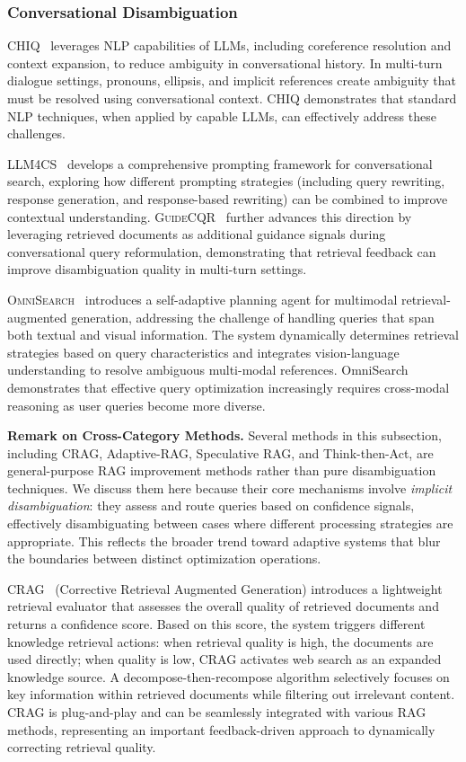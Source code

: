 \documentclass{article}
\begin{document}
\subsubsection{Conversational Disambiguation}

\textsc{CHIQ}~\citep{CHIQ} leverages NLP capabilities of LLMs, including coreference resolution and context expansion, to reduce ambiguity in conversational history. In multi-turn dialogue settings, pronouns, ellipsis, and implicit references create ambiguity that must be resolved using conversational context. CHIQ demonstrates that standard NLP techniques, when applied by capable LLMs, can effectively address these challenges.

\textsc{LLM4CS}~\citep{LLM4CS} develops a comprehensive prompting framework for conversational search, exploring how different prompting strategies (including query rewriting, response generation, and response-based rewriting) can be combined to improve contextual understanding. \textsc{GuideCQR}~\citep{GuideCQR} further advances this direction by leveraging retrieved documents as additional guidance signals during conversational query reformulation, demonstrating that retrieval feedback can improve disambiguation quality in multi-turn settings.

\textsc{OmniSearch}~\citep{OmniSearch} introduces a self-adaptive planning agent for multimodal retrieval-augmented generation, addressing the challenge of handling queries that span both textual and visual information. The system dynamically determines retrieval strategies based on query characteristics and integrates vision-language understanding to resolve ambiguous multi-modal references. OmniSearch demonstrates that effective query optimization increasingly requires cross-modal reasoning as user queries become more diverse.

\textbf{Remark on Cross-Category Methods.} Several methods in this subsection, including CRAG, Adaptive-RAG, Speculative RAG, and Think-then-Act, are general-purpose RAG improvement methods rather than pure disambiguation techniques. We discuss them here because their core mechanisms involve \textit{implicit disambiguation}: they assess and route queries based on confidence signals, effectively disambiguating between cases where different processing strategies are appropriate. This reflects the broader trend toward adaptive systems that blur the boundaries between distinct optimization operations.

\textsc{CRAG}~\citep{CRAG} (Corrective Retrieval Augmented Generation) introduces a lightweight retrieval evaluator that assesses the overall quality of retrieved documents and returns a confidence score. Based on this score, the system triggers different knowledge retrieval actions: when retrieval quality is high, the documents are used directly; when quality is low, CRAG activates web search as an expanded knowledge source. A decompose-then-recompose algorithm selectively focuses on key information within retrieved documents while filtering out irrelevant content. CRAG is plug-and-play and can be seamlessly integrated with various RAG methods, representing an important feedback-driven approach to dynamically correcting retrieval quality.
\end{document}
